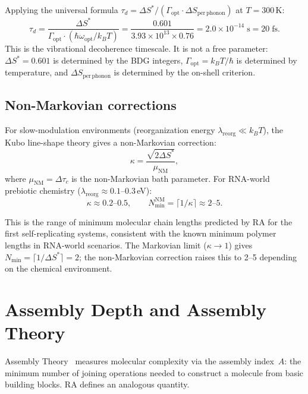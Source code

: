 \documentclass[11pt]{article}
\begin{document}
Applying the universal formula $\tau_d=\Delta S^*/(\Gamma_{\mathrm{opt}}\cdot\Delta S_{\mathrm{per\,phonon}})$ at $T=300$\,K:
\begin{equation}
\tau_d = \frac{\Delta S^*}{\Gamma_{\mathrm{opt}}\cdot(\hbar\omega_{\mathrm{opt}}/k_BT)} = \frac{0.601}{3.93\times 10^{13}\times 0.76} = 2.0\times 10^{-14}\;\mathrm{s} = 20\;\mathrm{fs}.
\end{equation}
This is the vibrational decoherence timescale. It is not a free parameter: $\Delta S^*=0.601$ is determined by the BDG integers, $\Gamma_{\mathrm{opt}}=k_BT/\hbar$ is determined by temperature, and $\Delta S_{\mathrm{per\,phonon}}$ is determined by the on-shell criterion.

\subsection{Non-Markovian corrections}

For slow-modulation environments (reorganization energy $\lambda_{\mathrm{reorg}}\ll k_BT$), the Kubo line-shape theory gives a non-Markovian correction:
\begin{equation}
\kappa = \frac{\sqrt{2\Delta S^*}}{\mu_{\mathrm{NM}}},
\end{equation}
where $\mu_{\mathrm{NM}}=\Delta\tau_c$ is the non-Markovian bath parameter. For RNA-world prebiotic chemistry ($\lambda_{\mathrm{reorg}}\approx 0.1$--$0.3$\,eV):
\begin{equation}
\kappa\approx 0.2\text{--}0.5, \qquad N_{\min}^{\mathrm{NM}}=\lceil 1/\kappa\rceil \approx 2\text{--}5.
\end{equation}

This is the range of minimum molecular chain lengths predicted by RA for the first self-replicating systems, consistent with the known minimum polymer lengths in RNA-world scenarios. The Markovian limit ($\kappa\to 1$) gives $N_{\min}=\lceil 1/\Delta S^*\rceil=2$; the non-Markovian correction raises this to 2--5 depending on the chemical environment.

\section{Assembly Depth and Assembly Theory}
\label{sec:assembly}

Assembly Theory~\cite{Sharma2023} measures molecular complexity via the assembly index~$A$: the minimum number of joining operations needed to construct a molecule from basic building blocks. RA defines an analogous quantity.
\end{document}
